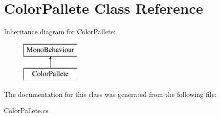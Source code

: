 \hypertarget{class_color_pallete}{}\section{Color\+Pallete Class Reference}
\label{class_color_pallete}
Inheritance diagram for Color\+Pallete\+:\begin{figure}[H]
\begin{center}
\leavevmode
\includegraphics[height=2.000000cm]{class_color_pallete}
\end{center}
\end{figure}


The documentation for this class was generated from the following file\+:\begin{DoxyCompactItemize}
\item 
Color\+Pallete.\+cs\end{DoxyCompactItemize}
